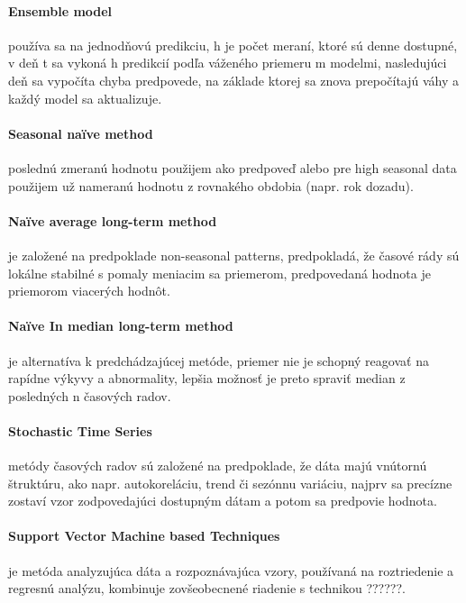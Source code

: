 \documentclass[12pt,oneside,slovak,a4paper]{book}
\begin{document}
\paragraph{Ensemble model}
používa sa na jednodňovú predikciu, h je počet meraní, ktoré sú denne dostupné,
v deň t sa vykoná h predikcií podľa váženého priemeru m modelmi, nasledujúci
deň sa vypočíta chyba predpovede, na základe ktorej sa znova prepočítajú váhy
a každý model sa aktualizuje\cite{Grmanova2016}.

\paragraph{Seasonal naïve method}
poslednú zmeranú hodnotu použijem ako predpoveď alebo pre high seasonal data
použijem už nameranú hodnotu z rovnakého obdobia (napr. rok
dozadu)\cite{Grmanova2016}.

\paragraph{Naïve average long-term method}
je založené na predpoklade non-seasonal patterns, predpokladá, že časové rády sú
lokálne stabilné s pomaly meniacim sa priemerom, predpovedaná hodnota je
priemorom viacerých hodnôt\cite{Grmanova2016}.

\paragraph{Naïve In median long-term method}
je alternatíva k predchádzajúcej metóde, priemer nie je schopný reagovať na
rapídne výkyvy a abnormality, lepšia možnosť je preto spraviť median
z posledných n časových radov\cite{Grmanova2016}.

\paragraph{Stochastic Time Series}
metódy časových radov sú založené na predpoklade, že dáta majú vnútornú
štruktúru, ako napr. autokoreláciu, trend či sezónnu variáciu, najprv sa
precízne zostaví vzor zodpovedajúci dostupným dátam a potom sa predpovie
hodnota\cite{KumarSingh2013}.

\paragraph{Support Vector Machine based Techniques}
je metóda analyzujúca dáta a rozpoznávajúca vzory, používaná na roztriedenie
a regresnú analýzu, kombinuje zovšeobecnené riadenie
s technikou ??????\cite{KumarSingh2013}.
\end{document}
